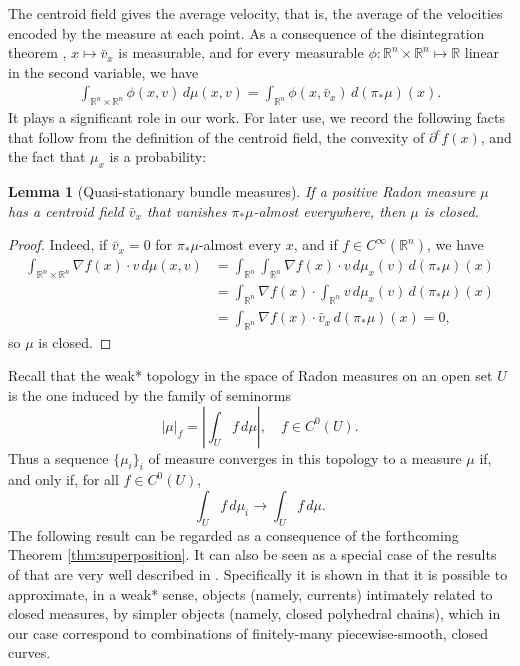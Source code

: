 \documentclass[11pt]{article}
\newtheorem{lem}[thm]{Lemma}
\theoremstyle{definition}
\theoremstyle{remark}
\newcommand{\R}{\mathbb{R}}
\begin{document}
 The centroid field gives the average velocity, that is, the average of the velocities encoded by the measure at each point. As a consequence of the disintegration theorem \cite{dellacherie1978probabilities}, $x\mapsto\bar v_x$ is measurable, and for every measurable $\phi \colon \R^n\times\R^n \mapsto \R$ linear in the second variable, we have
\begin{align}\label{eq:linearityvbar}
    \int_{\R^n\times\R^n}\phi(x,v) \,d\mu(x,v)=\int_{\R^n} \phi(x,\bar v_x)\, d(\pi_*\mu)(x).
\end{align}
It plays a significant role in our work.  
%
%
%
For later use, we record the following facts that follow from the definition of the centroid field, the convexity of $\partial^cf(x)$, and the fact that $\mu_x$ is a probability:

\begin{lem}[Quasi-stationary bundle measures]\label{lem:centroidclosed}
 If a positive Radon measure $\mu$ has a centroid field $\bar v_x$ that vanishes $\pi_*\mu$-almost everywhere, then $\mu$ is closed. 
\end{lem}
\begin{proof}
 Indeed, if $\bar v_x=0$ for $\pi_*\mu$-almost every $x$, and if $f\in C^\infty(\R^n)$, we have
 \begin{align*}
  \int_{\R^n\times\R^n} \nabla f(x)\cdot v\,d\mu(x,v)
  &=\int_{\R^n} \int_{\R^n} \nabla f(x)\cdot v\,d\mu_x(v)\,d(\pi_*\mu)(x)\\
  &=\int_{\R^n}  \nabla f(x)\cdot\int_{\R^n} v\,d\mu_x(v)\,d(\pi_*\mu)(x)\\
  &=\int_{\R^n}  \nabla f(x)\cdot\bar v_x\,d(\pi_*\mu)(x)=0,
 \end{align*}
 so $\mu$ is closed.
\end{proof}


Recall that the weak* topology in the space of Radon measures on an open set $U$ is the one induced by the family of seminorms
\[|\mu|_f=\left|\int_U f\,d\mu\right|,\quad f\in C^0(U).\]
Thus a sequence $\{\mu_i\}_i$ of measure converges in this topology to a measure $\mu$ if, and only if, for all $f\in C^0(U)$,
\[\int_U f\,d\mu_i\to \int_U f\,d\mu.\]
The following result can be regarded as a consequence of the forthcoming Theorem \ref{thm:superposition}. It can also be seen as a special case of the results of \cite{federer} that are very well described in \cite[Theorem 1.3.4.6]{giaquintamodica}. Specifically it is shown in \cite[Theorem 1.3.4.6]{giaquintamodica} that it is possible to approximate, in a weak* sense, objects (namely, currents) intimately related to closed measures, by simpler objects (namely, closed polyhedral chains), which in our case correspond to combinations of finitely-many piecewise-smooth, closed curves.
\end{document}
